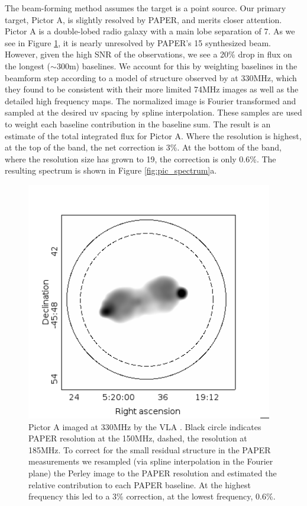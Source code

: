 \documentclass[preprint]{aastex}
\begin{document}
The beam-forming method assumes the target is a point source. Our primary
target, Pictor A, is slightly resolved by PAPER, and merits closer attention.
Pictor A is a double-lobed radio galaxy with a main lobe separation of
7\arcmin{}. As we see in Figure \ref{fig:pic_perley}, it is nearly unresolved by
PAPER's 15\arcmin{}  synthesized beam. However, given the high SNR of the
observations, we see a 20\% drop in flux on the longest ($\sim$300m) baselines. 
We account for this by weighting baselines
in the beamform step according to a model of structure observed by
\citet{Perley:1997p9312} at 330MHz, which they found to be consistent with
their more limited 74MHz images as well as the detailed high frequency maps.
The normalized image is Fourier transformed and sampled at the desired uv
spacing by spline interpolation. These samples are used to weight each baseline
contribution in the baseline sum. The result is an estimate of the total
integrated flux for Pictor A. Where the resolution is highest, at the top of
the band, the net correction is 3\%. At the bottom of the band, where the
resolution size has grown to 19\arcmin{}, the correction is only 0.6\%. The
resulting spectrum is shown in Figure \ref{fig:pic_spectrum}a.



\begin{figure}
\includegraphics[width=0.96\textwidth]{plots/picA_Perley.png}
\caption{
Pictor A imaged at 330MHz by the VLA \citep{Perley:1997p9312}. Black circle
indicates PAPER resolution at the 150MHz, dashed, the resolution at 185MHz.  To
correct for the small residual structure in the PAPER measurements we resampled 
(via spline interpolation in the Fourier plane)
the Perley image to the PAPER resolution and estimated the relative contribution
 to each PAPER baseline.  At the highest frequency this
led to a 3\% correction, at the lowest frequency, 0.6\%.
\label{fig:pic_perley}}
\end{figure}
\end{document}
